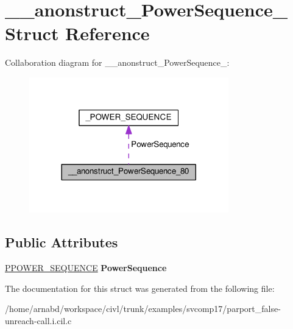 \hypertarget{struct____anonstruct__PowerSequence__80}{}\section{\+\_\+\+\_\+anonstruct\+\_\+\+Power\+Sequence\+\_ Struct Reference}
\label{struct____anonstruct__PowerSequence__80}


Collaboration diagram for \+\_\+\+\_\+anonstruct\+\_\+\+Power\+Sequence\+\_\+:
\nopagebreak
\begin{figure}[H]
\begin{center}
\leavevmode
\includegraphics[width=245pt]{struct____anonstruct__PowerSequence__80__coll__graph}
\end{center}
\end{figure}
\subsection*{Public Attributes}
\begin{DoxyCompactItemize}
\item 
\hypertarget{struct____anonstruct__PowerSequence__80_a42d21eca2b0045301023352fea66c7eb}{}\hyperlink{struct__POWER__SEQUENCE}{P\+P\+O\+W\+E\+R\+\_\+\+S\+E\+Q\+U\+E\+N\+C\+E} {\bfseries Power\+Sequence}\label{struct____anonstruct__PowerSequence__80_a42d21eca2b0045301023352fea66c7eb}

\end{DoxyCompactItemize}


The documentation for this struct was generated from the following file\+:\begin{DoxyCompactItemize}
\item 
/home/arnabd/workspace/civl/trunk/examples/svcomp17/parport\+\_\+false-\/unreach-\/call.\+i.\+cil.\+c\end{DoxyCompactItemize}
